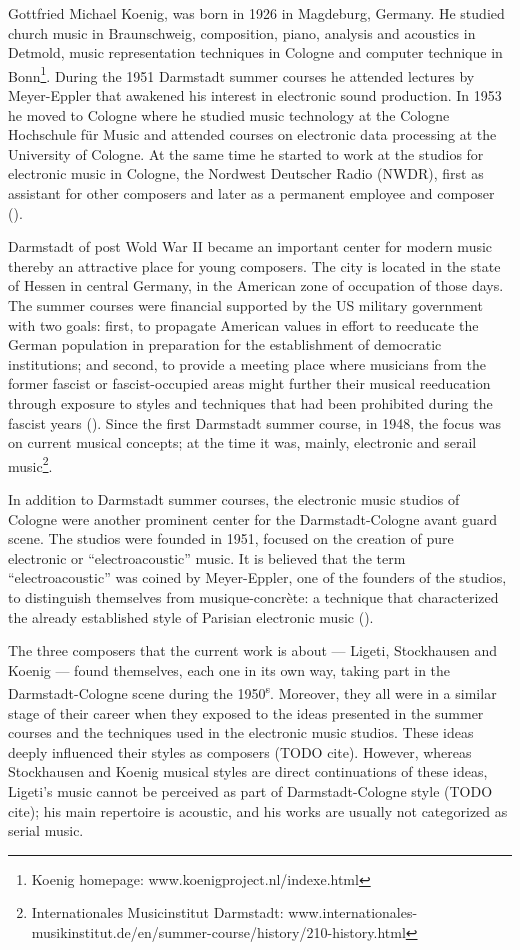 \documentclass[a4paper,11pt]{article}
\begin{document}
Gottfried Michael Koenig, was born in 1926 in Magdeburg, Germany.
He studied church music in Braunschweig, composition, piano, analysis and acoustics in Detmold, music representation techniques in Cologne and computer technique in Bonn\footnote{Koenig homepage: www.koenigproject.nl/indexe.html}.
During the 1951 Darmstadt summer courses he attended lectures by Meyer-Eppler that awakened his interest in electronic sound production.
In 1953 he moved to Cologne where he studied music technology at the Cologne Hochschule f{\"u}r Music and attended courses on electronic data processing at the University of Cologne.
At the same time he started to work at the studios for electronic music in Cologne, the Nordwest Deutscher Radio (NWDR), first as assistant for other composers and later as a permanent employee and composer (\cite{koenig_grove}).

Darmstadt of post Wold War II became an important center for modern music thereby an attractive place for young composers.
The city is located in the state of Hessen in central Germany, in the American zone of occupation of those days.
The summer courses were financial supported by the US military government with two goals:
first, to propagate American values in effort to reeducate the German population in preparation for the establishment of democratic institutions;
and second, to provide a meeting place where musicians from the former fascist or fascist-occupied areas might further their musical reeducation through exposure to styles and techniques that had been prohibited during the fascist years (\cite{darmstadt_oxford}).
Since the first Darmstadt summer course, in 1948, the focus was on current musical concepts;
at the time it was, mainly, electronic and serail music\footnote{Internationales Musicinstitut Darmstadt: www.internationales-musikinstitut.de/en/summer-course/history/210-history.html}.

In addition to Darmstadt summer courses, the electronic music studios of Cologne were another prominent center for the Darmstadt-Cologne avant guard scene.
The studios were founded in 1951, focused on the creation of pure electronic or ``electroacoustic'' music.
It is believed that the term ``electroacoustic'' was coined by Meyer-Eppler, one of the founders of the studios, to distinguish themselves from musique-concr{\`e}te:
a technique that characterized the already established style of Parisian electronic music (\cite{nwdr}).

The three composers that the current work is about --- Ligeti, Stockhausen and Koenig --- found themselves, each one in its own way, taking part in the Darmstadt-Cologne scene during the 1950\textsuperscript{s}.
Moreover, they all were in a similar stage of their career when they exposed to the ideas presented in the summer courses and the techniques used in the electronic music studios.
These ideas deeply influenced their styles as composers (TODO cite).
However, whereas Stockhausen and Koenig musical styles are direct continuations of these ideas, Ligeti's music cannot be perceived as part of Darmstadt-Cologne style (TODO cite);
his main repertoire is acoustic, and his works are usually not categorized as serial music.
\end{document}
